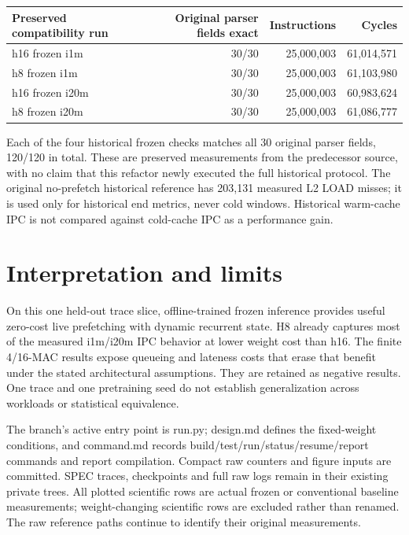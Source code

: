 \documentclass[10pt]{article}
\begin{document}
\begin{center}
\scriptsize
\begin{tabular}{lrrr}
\toprule
Preserved compatibility run & Original parser fields exact & Instructions & Cycles \\
\midrule
h16 frozen i1m & 30/30 & 25,000,003 & 61,014,571 \\
h8 frozen i1m & 30/30 & 25,000,003 & 61,103,980 \\
h16 frozen i20m & 30/30 & 25,000,003 & 60,983,624 \\
h8 frozen i20m & 30/30 & 25,000,003 & 61,086,777 \\
\bottomrule
\end{tabular}
\end{center}

Each of the four historical frozen checks matches all 30 original parser fields, 120/120 in total. These are preserved measurements from the predecessor source, with no claim that this refactor newly executed the full historical protocol. The original no-prefetch historical reference has 203,131 measured L2 LOAD misses; it is used only for historical end metrics, never cold windows. Historical warm-cache IPC is not compared against cold-cache IPC as a performance gain.

\section{Interpretation and limits}

On this one held-out trace slice, offline-trained frozen inference provides useful zero-cost live prefetching with dynamic recurrent state. H8 already captures most of the measured i1m/i20m IPC behavior at lower weight cost than h16. The finite 4/16-MAC results expose queueing and lateness costs that erase that benefit under the stated architectural assumptions. They are retained as negative results. One trace and one pretraining seed do not establish generalization across workloads or statistical equivalence.

The branch's active entry point is run.py; design.md defines the fixed-weight conditions, and command.md records build/test/run/status/resume/report commands and report compilation. Compact raw counters and figure inputs are committed. SPEC traces, checkpoints and full raw logs remain in their existing private trees. All plotted scientific rows are actual frozen or conventional baseline measurements; weight-changing scientific rows are excluded rather than renamed. The raw reference paths continue to identify their original measurements.
\end{document}
